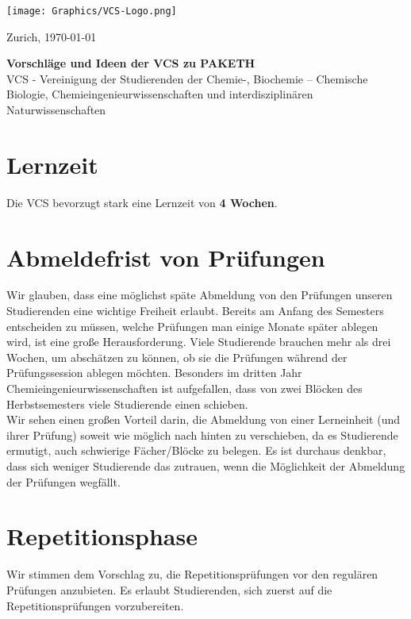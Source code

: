 \documentclass{article}
\begin{document}
\vspace{-4cm}
\texttt{[image: Graphics/VCS-Logo.png]}

\vspace{-1.5cm}
\begin{flushright}
\parbox[r]{5cm}{Zurich, \today}
\end{flushright}

\vspace{1.5cm}
\begin{center}
\textbf{\LARGE{Vorschläge und Ideen der VCS zu PAKETH}} \\
\vspace{0.5cm}
\Large
VCS - Vereinigung der Studierenden der Chemie-, Biochemie – Chemische Biologie, 
Chemieingenieurwissenschaften und interdisziplinären Naturwissenschaften
\end{center}

\section{Lernzeit}
Die VCS bevorzugt stark eine Lernzeit von \textbf{4 Wochen}.

\section{Abmeldefrist von Prüfungen}
Wir glauben, dass eine möglichst späte Abmeldung von den Prüfungen unseren Studierenden eine wichtige Freiheit erlaubt. Bereits am Anfang des Semesters entscheiden zu müssen, welche Prüfungen man einige Monate später ablegen wird, ist eine große Herausforderung. Viele Studierende brauchen mehr als drei Wochen, um abschätzen zu können, ob sie die Prüfungen während der Prüfungssession ablegen möchten. Besonders im dritten Jahr Chemieingenieurwissenschaften ist aufgefallen, dass von zwei Blöcken des Herbstsemesters viele Studierende einen schieben. \\

Wir sehen einen großen Vorteil darin, die Abmeldung von einer Lerneinheit (und ihrer Prüfung) soweit wie möglich nach hinten zu verschieben, da es Studierende ermutigt, auch schwierige Fächer/Blöcke zu belegen. Es ist durchaus denkbar, dass sich weniger Studierende das zutrauen, wenn die Möglichkeit der Abmeldung der Prüfungen wegfällt. 

\section{Repetitionsphase}
Wir stimmen dem Vorschlag zu, die Repetitionsprüfungen vor den regulären Prüfungen anzubieten. Es erlaubt Studierenden, sich zuerst auf die Repetitionsprüfungen vorzubereiten.
\end{document}
